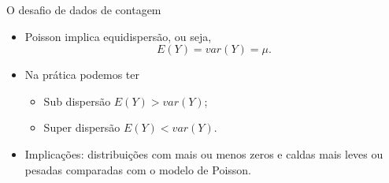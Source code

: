 \begin{frame}{O desafio de dados de contagem}
\begin{itemize}
\item Poisson implica equidispersão, ou seja,
$$ E(Y) = var(Y) = \mu. $$
\item Na prática podemos ter
\begin{itemize}
  \item Sub dispersão $E(Y) > var(Y)$;
  \item Super dispersão $E(Y) < var(Y)$.
\end{itemize}
  \item Implicações: distribuições com mais ou menos zeros e caldas
  mais leves ou pesadas comparadas com o modelo de Poisson.

\end{itemize}

\end{frame}
